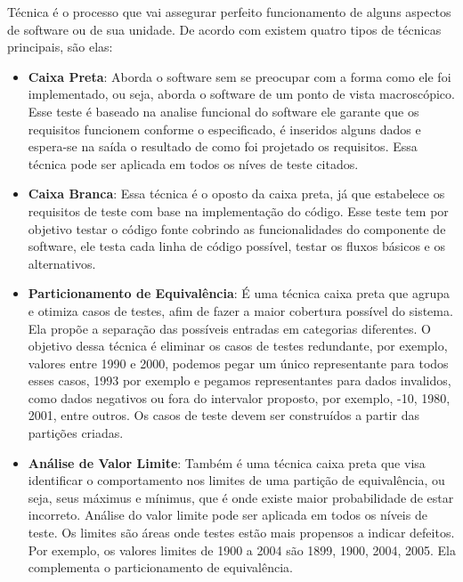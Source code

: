 Técnica é o processo que vai assegurar perfeito funcionamento de alguns aspectos de software ou de sua unidade. De
acordo com \cite{myers} existem quatro tipos de técnicas principais, são elas:

\begin{itemize}
  \item \textbf{Caixa Preta}: Aborda o software sem se preocupar com a forma como ele foi implementado, ou seja,
    aborda o software de um ponto de vista macroscópico. Esse teste é baseado na analise funcional do software ele
    garante que os requisitos funcionem conforme o especificado, é inseridos alguns dados e espera-se na saída o
    resultado de como foi projetado os requisitos. Essa técnica pode ser aplicada em todos os níves de teste citados.
  \item \textbf{Caixa Branca}: Essa técnica é o oposto da caixa preta, já que estabelece os requisitos de teste com
    base na implementação do código. Esse teste tem por objetivo testar o código fonte cobrindo as funcionalidades
    do componente de software, ele testa cada linha de código possível, testar os fluxos básicos e os alternativos.
  \item \textbf{Particionamento de Equivalência}: É uma técnica caixa preta que agrupa e otimiza casos de testes,
    afim de fazer a maior cobertura possível do sistema. Ela propõe a separação das possíveis entradas em
    categorias diferentes. O objetivo dessa técnica é eliminar os casos de testes redundante, por exemplo,
    valores entre 1990 e 2000, podemos pegar um único representante para todos esses casos, 1993 por exemplo
    e pegamos representantes para dados invalidos, como dados negativos ou fora do intervalor proposto, por
    exemplo, -10, 1980, 2001, entre outros. Os casos de teste devem ser construídos a partir das partições criadas.
  \item \textbf{Análise de Valor Limite}: Também é uma técnica caixa preta que visa identificar o comportamento nos
    limites de uma partição de equivalência, ou seja, seus máximus e mínimus, que é onde existe maior probabilidade de
    estar incorreto. Análise do valor limite pode ser aplicada em todos os níveis de teste. Os limites são áreas
    onde testes estão mais propensos a indicar defeitos. Por exemplo, os valores limites de 1900 a 2004 são 1899,
    1900, 2004, 2005. Ela complementa o particionamento de equivalência.
\end{itemize}
